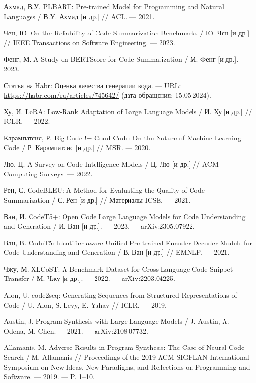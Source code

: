 \documentclass[14pt]{article}
\theoremstyle{definition}
\begin{document}
\newpage
{}
\begin{thebibliography}{99}

Ахмад, В.У. PLBART: Pre-trained Model for Programming and Natural Languages / В.У. Ахмад [и др.] // ACL. — 2021.

Чен, Ю. On the Reliability of Code Summarization Benchmarks / Ю. Чен [и др.] // IEEE Transactions on Software Engineering. — 2023.

Фенг, М. A Study on BERTScore for Code Summarization / М. Фенг [и др.]. — 2023.

Статья на Habr: Оценка качества генерации кода. — URL: \url{https://habr.com/ru/articles/745642/} (дата обращения: 15.05.2024).

Ху, И. LoRA: Low-Rank Adaptation of Large Language Models / И. Ху [и др.] // ICLR. — 2022.

Карампатсис, Р. Big Code != Good Code: On the Nature of Machine Learning Code / Р. Карампатсис [и др.] // MSR. — 2020.

Лю, Ц. A Survey on Code Intelligence Models / Ц. Лю [и др.] // ACM Computing Surveys. — 2022.

Рен, С. CodeBLEU: A Method for Evaluating the Quality of Code Summarization / С. Рен [и др.] // Материалы ICSE. — 2021.

Ван, И. CodeT5+: Open Code Large Language Models for Code Understanding and Generation / И. Ван [и др.]. — 2023. — arXiv:2305.07922.

Ван, В. CodeT5: Identifier-aware Unified Pre-trained Encoder-Decoder Models for Code Understanding and Generation / В. Ван [и др.] // EMNLP. — 2021.

Чжу, М. XLCoST: A Benchmark Dataset for Cross-Language Code Snippet Transfer / М. Чжу [и др.]. — 2022. — arXiv:2203.04225.

Alon, U. code2seq: Generating Sequences from Structured Representations of Code / U. Alon, S. Levy, E. Yahav // ICLR. — 2019.

Austin, J. Program Synthesis with Large Language Models / J. Austin, A. Odena, M. Chen. — 2021. — arXiv:2108.07732.

Allamanis, M. Adverse Results in Program Synthesis: The Case of Neural Code Search / M. Allamanis // Proceedings of the 2019 ACM SIGPLAN International Symposium on New Ideas, New Paradigms, and Reflections on Programming and Software. — 2019. — P. 1–10.


\end{thebibliography}
\end{document}
